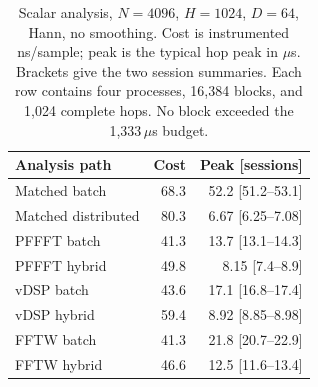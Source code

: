 \begin{table}[htbp]
\centering\small
\begin{tabular}{@{}lrr@{}}
\toprule
Analysis path & Cost & Peak [sessions] \\
\midrule
Matched batch & 68.3 & 52.2 [51.2--53.1] \\
Matched distributed & 80.3 & 6.67 [6.25--7.08] \\
PFFFT batch & 41.3 & 13.7 [13.1--14.3] \\
PFFFT hybrid & 49.8 & 8.15 [7.4--8.9] \\
vDSP batch & 43.6 & 17.1 [16.8--17.4] \\
vDSP hybrid & 59.4 & 8.92 [8.85--8.98] \\
FFTW batch & 41.3 & 21.8 [20.7--22.9] \\
FFTW hybrid & 46.6 & 12.5 [11.6--13.4] \\
\bottomrule
\end{tabular}
\caption{Scalar analysis, $N=4096$, $H=1024$, $D=64$, Hann, no smoothing. Cost is instrumented ns/sample; peak is the typical hop peak in $\mu$s. Brackets give the two session summaries. Each row contains four processes, 16,384 blocks, and 1,024 complete hops. No block exceeded the 1,333\,$\mu$s budget.}
\label{tab:conference-baselines}
\end{table}

